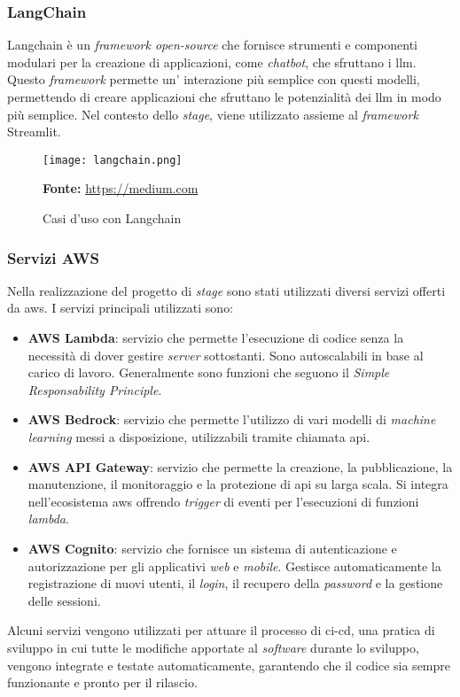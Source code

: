 \subsubsection{LangChain}
Langchain è un \textit{framework open-source} che fornisce strumenti e componenti modulari per la creazione di applicazioni, come \textit{chatbot}, che sfruttano i \gls{llm}. Questo \textit{framework} permette un' interazione più semplice con questi modelli, permettendo di creare applicazioni che sfruttano le potenzialità dei \gls{llm} in modo più semplice. Nel contesto dello \textit{stage}, viene utilizzato assieme al \textit{framework} Streamlit.
\begin{figure}[H]
    \centering
    \texttt{[image: langchain.png]}
    \caption{Casi d'uso con Langchain} 
    \small \textbf{Fonte:} \href{https://medium.com/@ebruboyaci/use-cases-with-langchain-e0fd5b0587f1}{https://medium.com}
    \label{fig:Lanchain}
\end{figure} 

\subsubsection {Servizi AWS}
Nella realizzazione del progetto di \textit{stage} sono stati utilizzati diversi servizi offerti da \gls{aws}. I servizi principali utilizzati sono:
\begin{itemize}
    \item \textbf{AWS Lambda}: servizio che permette l'esecuzione di codice senza la necessità di dover gestire \textit{server} sottostanti. Sono autoscalabili in base al carico di lavoro. Generalmente sono funzioni che seguono il \textit{Simple Responsability Principle}.
    \item \textbf{AWS Bedrock}: servizio che permette l'utilizzo di vari modelli di \textit{machine learning} messi a disposizione, utilizzabili tramite chiamata \gls{api}.
    \item \textbf{AWS API Gateway}: servizio che permette la creazione, la pubblicazione, la manutenzione, il monitoraggio e la protezione di \gls{api} su larga scala. Si integra nell'ecosistema \gls{aws} offrendo \textit{trigger} di eventi per l'esecuzioni di funzioni \textit{lambda}.
    \item \textbf{AWS Cognito}: servizio che fornisce un sistema di autenticazione e autorizzazione per gli applicativi \textit{web} e \textit{mobile}. Gestisce automaticamente la registrazione di nuovi utenti, il \textit{login}, il recupero della \textit{password} e la gestione delle sessioni.
\end{itemize}
Alcuni servizi vengono utilizzati per attuare il processo di \gls{ci-cd}, una pratica di sviluppo in cui tutte le modifiche apportate al \textit{software} durante lo sviluppo, vengono integrate e testate automaticamente, garantendo che il codice sia sempre funzionante e pronto per il rilascio.
